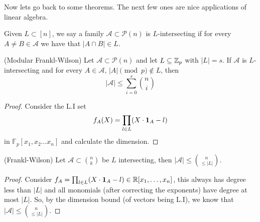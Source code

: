 Now lets go back to some theorems. The next few ones are nice
applications of linear algebra.
\begin{definition}
	Given $L \subset [n]$, we say a family $\mathcal{A} \subset
	\mathcal{P}(n)$ is $L$-intersecting if for every $A\neq B \in \mathcal{A}$
	we have that $|A \cap B| \in L$.
\end{definition}

\begin{theorem}(Modular Frankl-Wilson)
	\label{trm:mfkw}
	Let $\mathcal{A} \subset \mathcal{P}(n)$ and let $L\subseteq \mathbb{Z}_p$
	with $|L| = s$. If $\mathcal{A}$ is $L$-intersecting
	and for every $A \in \mathcal{A}$, $|A| \pmod p \not \in L$, then
	\[
		|\mathcal{A}| \leq \sum_{i=0}^s \binom{n}{i}
	\]
\end{theorem}

\begin{proof}
	Consider the L.I set
	\[
		f_A(X) = \prod_{l \in L} (X\cdot \bm{1}_{A} - l)
	\]
	in $\mathbb{F}_p[x_1, x_2 \dots x_n]$ and calculate the dimension.
\end{proof}

\begin{theorem}(Frankl-Wilson)
	\label{trm:fkw_size_k}
	Let $\mathcal{A} \subset \binom{n}{k}$ be $L$ intersecting, then
	$|\mathcal{A}| \leq \binom{n}{\leq|L|}$.
\end{theorem}
\begin{proof}
	Consider $f_A = \prod_{l \in L} (X\cdot \bm{1}_{A} - l) \in
	\mathbb{R}[x_1,\dots, x_n]$, this always has degree less than $|L|$ and all
	monomials (after correcting the exponents) have degree at most $|L|$.
	So, by the dimension bound (of vectors being L.I), we know that
	$|\mathcal{A}| \leq \binom{n}{\leq |L|}$.
\end{proof}

